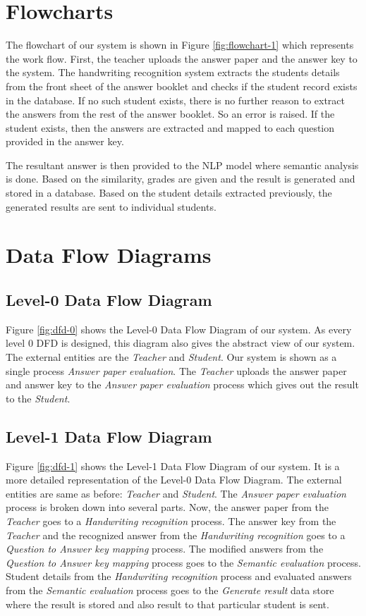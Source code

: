 \section{Flowcharts}

\noindent The flowchart of our system is shown in Figure \ref{fig:flowchart-1} which
represents the work flow. First, the teacher uploads the answer paper and the answer key to
the system. The handwriting recognition system extracts the students details from the front sheet
of the answer booklet and checks if the student record exists in the database. If no such
student exists, there is no further reason to extract the answers from the rest of the answer booklet.
So an error is raised. If the student exists, then the answers are extracted and mapped to
each question provided in the answer key.

The resultant answer is then provided to the NLP model where semantic analysis is done. Based
on the similarity, grades are given and the result is generated and stored in a database. 
Based on the student details extracted previously, the generated results are sent to individual
students.
\section{Data Flow Diagrams}
\subsection{Level-0 Data Flow Diagram}

\noindent Figure \ref{fig:dfd-0} shows the Level-0 Data Flow Diagram of our system. 
As every level 0
DFD is designed, this diagram also gives the abstract view of our system. The external entities
are the \emph{Teacher} and \emph{Student}. Our system is shown as a single process \emph{Answer
paper evaluation}. The \emph{Teacher} uploads the answer paper and answer key to the \emph{
Answer paper evaluation} process which gives out the result to the \emph{Student}.
\subsection{Level-1 Data Flow Diagram}

\noindent Figure \ref{fig:dfd-1} shows the Level-1 Data Flow Diagram of our system.
It is a more detailed representation of the Level-0 Data Flow Diagram.
The external entities are same as before: \emph{Teacher} and \emph{Student}.
The \emph{Answer paper evaluation} process is broken down into several parts.
Now, the answer paper from the \emph{Teacher} goes to a \emph{Handwriting recognition}
process. The answer key from the \emph{Teacher}
and the recognized answer from the 
\emph{Handwriting recognition} goes to a \emph{Question to Answer key mapping} process.
The modified answers from the \emph{Question to Answer key mapping} process
goes to the \emph{Semantic evaluation} process. Student details from
the \emph{Handwriting recognition} process and evaluated answers
from the \emph{Semantic evaluation} process goes to the
\emph{Generate result} data store where the result is stored 
and also result to that particular student is sent.
